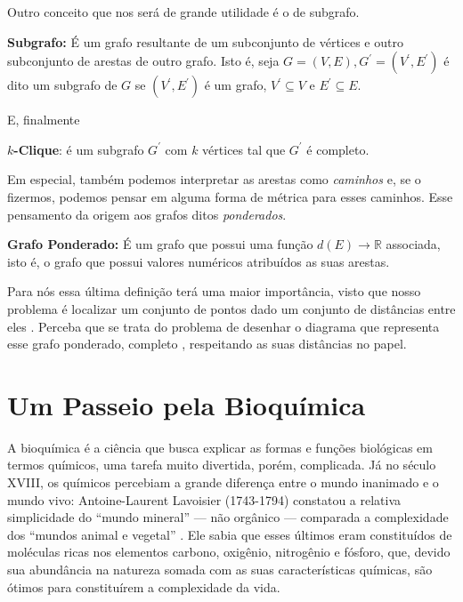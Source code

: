 \documentclass[a4paper,12pt]{article}
\begin{document}
	Outro conceito que nos será de grande utilidade é o de subgrafo.
	\begin{center}
		\begin{minipage}{0.9 \linewidth}
			\textbf{Subgrafo:} É um grafo resultante de um subconjunto de vértices e outro subconjunto de arestas de outro grafo. Isto é, seja $G = (V, E), G^\prime = (V^\prime, E^\prime)$ é dito um subgrafo de $G$ se $(V^\prime, E^\prime)$ é um grafo, $V^\prime \subseteq V$ e $E^\prime \subseteq E$.
		\end{minipage}
	\end{center}
	
	E, finalmente
	\begin{center}
		\begin{minipage}{0.9 \linewidth}
			\textbf{$k$-Clique}: é um subgrafo $G^\prime$ com $k$ vértices tal que $G^\prime$ é completo.
		\end{minipage}
	\end{center}
	
	Em especial, também podemos interpretar as arestas como \textit{caminhos} e, se o fizermos, podemos pensar em alguma forma de métrica para esses caminhos. Esse pensamento da origem aos grafos ditos \textit{ponderados}.
	
	
	\begin{center}
		\begin{minipage}{0.9 \linewidth}
			\textbf{Grafo Ponderado:} É um grafo que possui uma função $d(E) \rightarrow \mathbb{R}$ associada, isto é, o grafo que possui valores numéricos atribuídos as suas arestas.
		\end{minipage}
	\end{center}

	Para nós essa última definição terá uma maior importância, visto que nosso problema é localizar um conjunto de pontos dado um conjunto de distâncias entre eles \cite{fidalgotese}. Perceba que se trata do problema de desenhar o diagrama que representa esse grafo ponderado, completo \cite{carlileBook31Coloquio}, respeitando as suas distâncias no papel.		
	
	\newpage
	
	\section{Um Passeio pela Bioquímica}
	A bioquímica é a ciência que busca explicar as formas e funções biológicas em termos químicos, uma tarefa muito divertida, porém, complicada. Já no século XVIII, os químicos percebiam a grande diferença entre o mundo inanimado e o mundo vivo: Antoine-Laurent Lavoisier (1743-1794) constatou a relativa simplicidade do ``mundo mineral'' --- não orgânico --- comparada a complexidade dos ``mundos animal e vegetal'' \cite{bioquimicaLehninger}. Ele sabia que esses últimos eram constituídos de moléculas ricas nos elementos carbono, oxigênio, nitrogênio e fósforo, que, devido sua abundância na natureza somada com as suas características químicas, são ótimos para constituírem a complexidade da vida.
\end{document}
